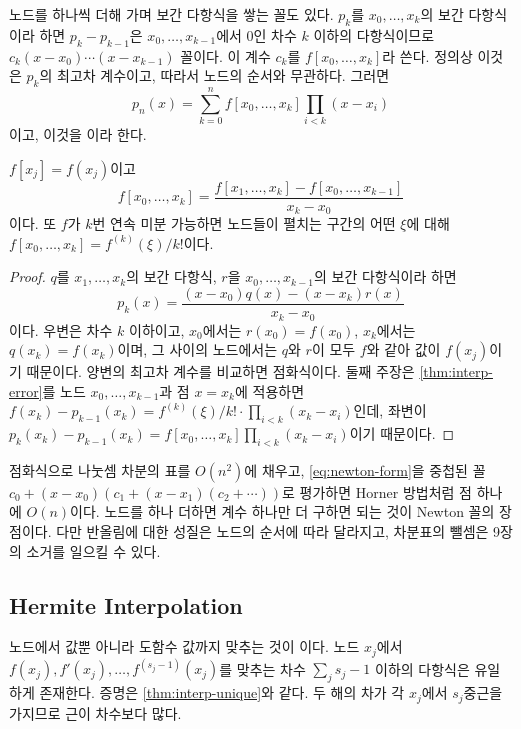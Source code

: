 노드를 하나씩 더해 가며 보간 다항식을 쌓는 꼴도 있다. $p_k$를 $x_0,\dots,x_k$의 보간 다항식이라 하면 $p_k-p_{k-1}$은 $x_0,\dots,x_{k-1}$에서 $0$인 차수 $k$ 이하의 다항식이므로 $c_k(x-x_0)\cdots(x-x_{k-1})$ 꼴이다. 이 계수 $c_k$를  $f[x_0,\dots,x_k]$라 쓴다. 정의상 이것은 $p_k$의 최고차 계수이고, 따라서 노드의 순서와 무관하다. 그러면
\begin{equation}
\label{eq:newton-form}
p_n(x)=\sum_{k=0}^nf[x_0,\dots,x_k]\prod_{i<k}(x-x_i)
\end{equation}
이고, 이것을 이라 한다.

\begin{proposition}
\label{prop:divided-difference}
$f[x_j]=f(x_j)$이고
\[
f[x_0,\dots,x_k]=\frac{f[x_1,\dots,x_k]-f[x_0,\dots,x_{k-1}]}{x_k-x_0}
\]
이다. 또 $f$가 $k$번 연속 미분 가능하면 노드들이 펼치는 구간의 어떤 $\xi$에 대해 $f[x_0,\dots,x_k]=f^{(k)}(\xi)/k!$이다.
\end{proposition}

\begin{proof}
$q$를 $x_1,\dots,x_k$의 보간 다항식, $r$을 $x_0,\dots,x_{k-1}$의 보간 다항식이라 하면
\[
p_k(x)=\frac{(x-x_0)q(x)-(x-x_k)r(x)}{x_k-x_0}
\]
이다. 우변은 차수 $k$ 이하이고, $x_0$에서는 $r(x_0)=f(x_0)$, $x_k$에서는 $q(x_k)=f(x_k)$이며, 그 사이의 노드에서는 $q$와 $r$이 모두 $f$와 같아 값이 $f(x_j)$이기 때문이다. 양변의 최고차 계수를 비교하면 점화식이다. 둘째 주장은 \cref{thm:interp-error}를 노드 $x_0,\dots,x_{k-1}$과 점 $x=x_k$에 적용하면 $f(x_k)-p_{k-1}(x_k)=f^{(k)}(\xi)/k!\cdot\prod_{i<k}(x_k-x_i)$인데, 좌변이 $p_k(x_k)-p_{k-1}(x_k)=f[x_0,\dots,x_k]\prod_{i<k}(x_k-x_i)$이기 때문이다.
\end{proof}

점화식으로 나눗셈 차분의 표를 $O(n^2)$에 채우고, \eqref{eq:newton-form}을 중첩된 꼴 $c_0+(x-x_0)(c_1+(x-x_1)(c_2+\cdots))$로 평가하면 Horner 방법처럼 점 하나에 $O(n)$이다. 노드를 하나 더하면 계수 하나만 더 구하면 되는 것이 Newton 꼴의 장점이다. 다만 반올림에 대한 성질은 노드의 순서에 따라 달라지고, 차분표의 뺄셈은 9장의 소거를 일으킬 수 있다.

\subsection{Hermite Interpolation}

노드에서 값뿐 아니라 도함수 값까지 맞추는 것이 이다. 노드 $x_j$에서 $f(x_j),f'(x_j),\dots,f^{(s_j-1)}(x_j)$를 맞추는 차수 $\sum_js_j-1$ 이하의 다항식은 유일하게 존재한다. 증명은 \cref{thm:interp-unique}와 같다. 두 해의 차가 각 $x_j$에서 $s_j$중근을 가지므로 근이 차수보다 많다.

